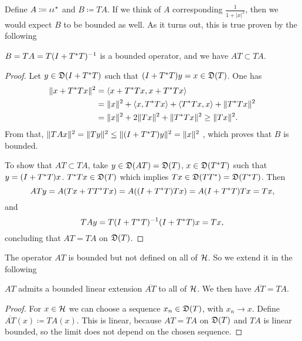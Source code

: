 Define $A \coloneqq \iota \iota ^{*}$ and $B \coloneqq TA$. 
If we think of $A$ corresponding $\frac{1}{1 + |x|^2}$, then we would expect
$B$ to be bounded as well.
As it turns out, this is true proven by the following

\begin{lem}
 $B = TA = T(I + T ^{*} T)^{-1}$ is a bounded operator, and we have
 $AT \subset TA$.
\end{lem}



\begin{proof}
 Let $y \in \mathfrak{D}(I + T ^{*} T)$ such that $(I + T ^{*} T)y = x \in \mathfrak{D}(T)$.
 One has 
 \begin{align*}
   \|x + T ^{*} T x\|^2 &= \left\langle x + T ^{*} T x, x + T ^{*} T x \right\rangle\\
   &= \|x\|^2 +  \left\langle x, T ^{*} Tx \right\rangle + \left\langle T ^{*} Tx, x \right\rangle+ \|T ^{*} Tx\|^2\\
   &= \|x\|^2 + 2\|Tx\|^2 + \|T ^{*} Tx\|^2 \geq \|Tx\|^2.
 \end{align*}
From that, $\| TAx\|^2 = \| Ty \| ^2 \leq \| (I + T ^{*} T)y \|^2 = \| x \| ^2$
, which proves that $B$ is bounded. 

To show that $AT \subset TA$, take $y \in \mathfrak{D}(AT) = \mathfrak{D}(T)$,
$x \in \mathfrak{D}(T ^{*} T)$ such that $y = ( I +  T ^{*} T)x$. $T ^{*} T x \in \mathfrak{D}(T)$
which implies $Tx \in \mathfrak{D}(TT^{*}) = \mathfrak{D}(T^{*} T)$. Then 
\[
 ATy = A(Tx + T T^{*} T x) = A((I + T^{*} T)Tx)= A(I+ T^{*} T)Tx= Tx,
\]
and
\[
 TAy= T(I+ T^{*} T)^{-1} (I + T ^{*} T)x=Tx,
\]
concluding that $AT = TA$ on $\mathfrak{D}(T)$.

\end{proof}

The operator $AT$ is bounded but not defined on all of $\mathcal{H}$. So we extend it
in the following

\begin{lem}
 $AT$ admits a bounded linear extension $\overline{AT}$ to all of $\mathcal{H}$. 
 We then have $\overline{AT}=TA$.
\end{lem}

\begin{proof}
 For $x \in \mathcal{H}$ we can choose a sequence $x_n \in \mathfrak{D}(T)$, with 
 $x_n \rightarrow x$. Define $\overline{AT}(x) \coloneqq TA(x)$.
 This is linear, because $AT = TA$ on $\mathfrak{D}(T)$ and $TA$ is linear bounded,
 so the limit does not depend on the chosen sequence.
\end{proof}

